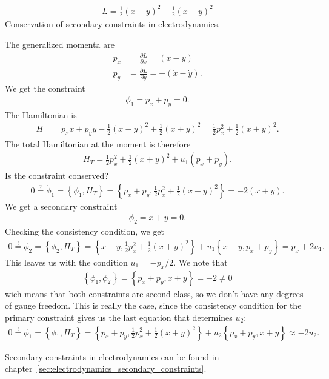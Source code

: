 \newpage

\begin{exercise}
\begin{align*}
L = \frac{1}{2} (\dot{x} - \dot{y})^2 - \frac{1}{2} (x + y)^2
\end{align*}
Conservation of secondary constraints in electrodynamics.
\end{exercise}
\begin{solution}
The generalized momenta are
\begin{align*}
p_x &= \frac{\partial L}{\partial \dot{x}} = (\dot{x} - \dot{y}) \\
p_y &= \frac{\partial L}{\partial \dot{y}} = - (\dot{x} - \dot{y}).
\end{align*}
We get the constraint 
\begin{align*}
\phi_1 = p_x + p_y = 0.
\end{align*}
The Hamiltonian is
\begin{align*}
H &= p_x \dot{x} + p_y \dot{y} - \frac{1}{2} (\dot{x} - \dot{y})^2 + \frac{1}{2} (x + y)^2 = \frac{1}{2} p_x^2 + \frac{1}{2} (x + y)^2.
\end{align*}
The total Hamiltonian at the moment is therefore
\begin{align*}
H_T = \frac{1}{2} p_x^2 + \frac{1}{2} (x + y)^2 + u_1 (p_x + p_y).
\end{align*}
Is the constraint conserved?
\begin{align*}
0 \overset{?}{=} \dot{\phi}_1 = \left \{ \phi_1,H_T \right \} = \left \{ p_x + p_y,\frac{1}{2} p_x^2 + \frac{1}{2} (x + y)^2 \right \} = - 2 (x + y).
\end{align*}
We get a secondary constraint 
\begin{align*}
\phi_2 = x + y = 0.
\end{align*}
Checking the consistency condition, we get
\begin{align*}
0 \overset{!}{=} \dot{\phi}_2 = \left \{ \phi_2,H_T \right \} = \left \{ x + y,\frac{1}{2} p_x^2 + \frac{1}{2} (x + y)^2 \right \} + u_1 \left \{ x + y,p_x + p_y \right \} = p_x + 2 u_1.
\end{align*}
This leaves us with the condition $u_1 = - p_x / 2$. We note that 
\begin{align*}
\left \{ \phi_1,\phi_2 \right \} = \left \{ p_x + p_y,x + y \right \} = - 2 \neq 0
\end{align*}
wich means that both constraints are second-class, so we don't have any degrees of gauge freedom. This is really the case, since the consistency condition for the primary constraint gives us the last equation that determines $u_2$:
\begin{align*}
0 \overset{!}{=} \dot{\phi}_1 = \left \{ \phi_1,H_T \right \} = \left \{ p_x + p_y,\frac{1}{2} p_x^2 + \frac{1}{2} (x + y)^2 \right \} + u_2 \left \{ p_x + p_y,x + y \right \} \approx - 2 u_2.
\end{align*}

Secondary constraints in electrodynamics can be found in chapter~\vref{sec:electrodynamics_secondary_constraints}.
\end{solution}


